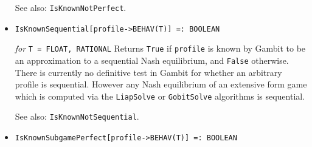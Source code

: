 \begin{itemize}
{\it for} {\tt T = FLOAT, RATIONAL}
\bd 
Returns \verb+True+ if \verb+profile+
is known by Gambit to be a perfect Nash equilibrium, and \verb+False+
otherwise.  There is currently no definitive test in Gambit for
whether an arbitrary profile is perfect, so it is possible for a
perfect equilibrium to return \verb+False+.  However some of the
algorithms (notably \verb+LcpSolve+) will only return perfect
equilibria, which are marked as such.  
\item [See also:] \verb+IsKnownNotPerfect+.
\ed

\item{}
\protect \large \begin{verbatim}
IsKnownSequential[profile->BEHAV(T)] =: BOOLEAN
\end{verbatim}\normalsize

{\it for} {\tt T = FLOAT, RATIONAL}
\bd 
Returns \verb+True+ if \verb+profile+
is known by Gambit to be an approximation to a
sequential Nash equilibrium, and \verb+False+ otherwise.  There is
currently no definitive test in Gambit for whether an arbitrary
profile is sequential.  However any Nash equilibrium of an extensive
form game which is computed via the \verb+LiapSolve+ or
\verb+GobitSolve+ algorithms is sequential.
\item [See also:] \verb+IsKnownNotSequential+.
\ed



\item{}
\protect \large \begin{verbatim}
IsKnownSubgamePerfect[profile->BEHAV(T)] =: BOOLEAN
\end{verbatim}\normalsize


\end{itemize}
